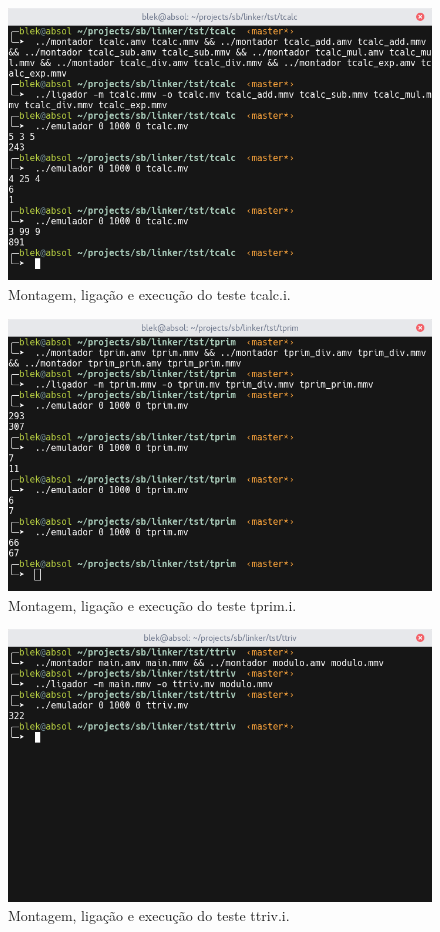 \documentclass[12pt,a4paper]{article}
\numberwithin{equation}{section}
\begin{document}
\begin{figure}[h]
    \includegraphics[scale=0.6]{imagens/tcalc.png}
    \centering
    \caption{Montagem, ligação e execução do teste tcalc.i.}
\end{figure}

\begin{figure}[h]
    \includegraphics[scale=0.6]{imagens/tprim.png}
    \centering
    \caption{Montagem, ligação e execução do teste tprim.i.}
\end{figure}

\begin{figure}[h]
    \includegraphics[scale=0.6]{imagens/ttriv.png}
    \centering
    \caption{Montagem, ligação e execução do teste ttriv.i.}
\end{figure}

\FloatBarrier
\end{document}
